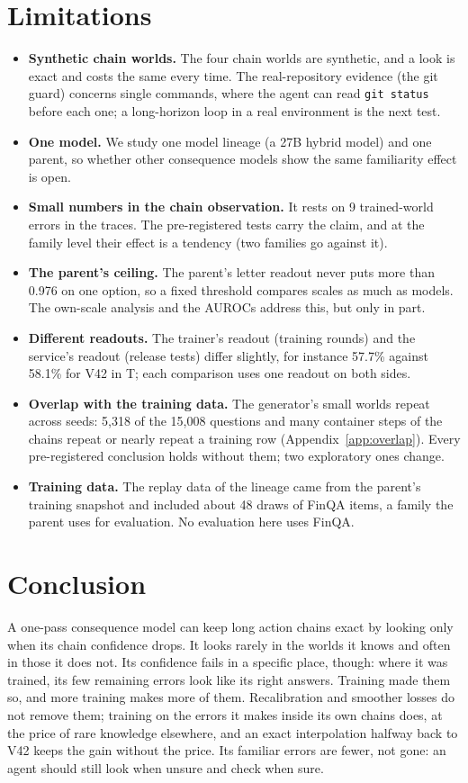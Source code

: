 \documentclass[11pt]{article}
\begin{document}
\section{Limitations}\label{sec:lim}
\begin{itemize}
  \item \textbf{Synthetic chain worlds.} The four chain worlds are synthetic, and a look is exact and costs the same
  every time. The real-repository evidence (the git guard) concerns single commands, where the agent can read
  \texttt{git status} before each one; a long-horizon loop in a real environment is the next test.
  \item \textbf{One model.} We study one model lineage (a 27B hybrid model) and one parent, so whether other
  consequence models show the same familiarity effect is open.
  \item \textbf{Small numbers in the chain observation.} It rests on 9 trained-world errors in the traces. The
  pre-registered tests carry the claim, and at the family level their effect is a tendency (two families go against
  it).
  \item \textbf{The parent's ceiling.} The parent's letter readout never puts more than 0.976 on one option, so a
  fixed threshold compares scales as much as models. The own-scale analysis and the AUROCs address this, but only in
  part.
  \item \textbf{Different readouts.} The trainer's readout (training rounds) and the service's readout (release tests)
  differ slightly, for instance 57.7\% against 58.1\% for V42 in T; each comparison uses one readout on
  both sides.
  \item \textbf{Overlap with the training data.} The generator's small worlds repeat across seeds: 5,318 of the 15,008
  questions and many container steps of the chains repeat or nearly repeat a training row (Appendix~\ref{app:overlap}).
  Every pre-registered conclusion holds without them; two exploratory ones change.
  \item \textbf{Training data.} The replay data of the lineage came from the parent's training snapshot and included
  about 48 draws of FinQA items, a family the parent uses for evaluation. No evaluation here uses FinQA.
\end{itemize}

\section{Conclusion}
A one-pass consequence model can keep long action chains exact by looking only when its chain confidence drops. It
looks rarely in the worlds it knows and often in those it does not. Its confidence fails in a specific place, though:
where it was trained, its few remaining errors look like its right answers. Training made them so, and more training
makes more of them. Recalibration and smoother losses do not remove them; training on the errors it makes inside its
own chains does, at the price of rare knowledge elsewhere, and an exact interpolation halfway back to V42
keeps the gain without the price. Its familiar errors are fewer, not gone: an agent should still look when unsure and
check when sure.
\end{document}
